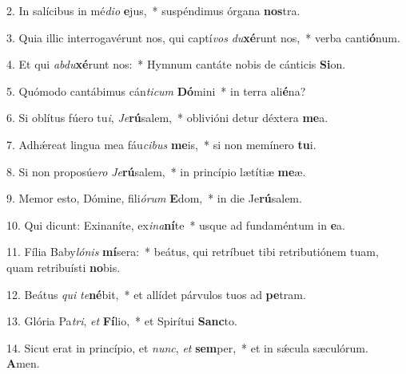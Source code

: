 2. In salícibus in mé\textit{di}\textit{o} \textbf{e}jus,~*  suspéndimus órgana \textbf{nos}tra.\

3. Quia illic interrogavérunt nos, qui captí\textit{vos} \textit{du}\textbf{xé}runt nos,~*  verba canti\textbf{ó}num.\

4. Et qui \textit{ab}\textit{du}\textbf{xé}runt nos:~*  Hymnum cantáte nobis de cánticis \textbf{Si}on.\

5. Quómodo cantábimus cán\textit{ti}\textit{cum} \textbf{Dó}mini~*  in terra ali\textbf{é}na?\

6. Si oblítus fúero tu\textit{i}, \textit{Je}\textbf{rú}salem,~*  oblivióni detur déxtera \textbf{me}a.\

7. Adhǽreat lingua mea fáu\textit{ci}\textit{bus} \textbf{me}is,~*  si non memínero \textbf{tu}i.\

8. Si non proposúe\textit{ro} \textit{Je}\textbf{rú}salem,~*  in princípio lætítiæ \textbf{me}æ.\

9. Memor esto, Dómine, fili\textit{ó}\textit{rum} \textbf{E}dom,~*  in die Je\textbf{rú}salem.\

10. Qui dicunt: Exinaníte, ex\textit{i}\textit{na}\textbf{ní}te~*  usque ad fundaméntum in \textbf{e}a.\

11. Fília Baby\textit{ló}\textit{nis} \textbf{mí}sera:~*  beátus, qui retríbuet tibi retributiónem tuam, quam retribuísti \textbf{no}bis.\

12. Beátus \textit{qui} \textit{te}\textbf{né}bit,~*  et allídet párvulos tuos ad \textbf{pe}tram.\

13. Glória Pa\textit{tri}, \textit{et} \textbf{Fí}lio,~*  et Spirítui \textbf{Sanc}to.\

14. Sicut erat in princípio, et \textit{nunc}, \textit{et} \textbf{sem}per,~*  et in sǽcula sæculórum. \textbf{A}men.\

